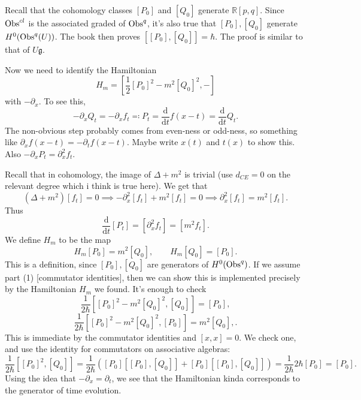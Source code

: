 Recall that the cohomology classes $[P_0]$ and $[Q_0]$ generate $\mathbb{R} [p,q]$. Since $\operatorname{Obs}^{cl} $ is the associated graded of $\operatorname{Obs}^{q} $, it's also true that $[P_0],[Q_0]$ generate $H^0(\operatorname{Obs}^q(U))$. The book then proves $[[P_0],[Q_0]]=\hbar $. The proof is similar to that of $U\mathfrak{g} $.

Now we need to identify the Hamiltonian
\[
	H_m = \left[ \frac{1}{2} [P_0]^2 - m^2[Q_0]^2,- \right] 
\]
with $-\partial _x$. To see this,
\[
	-\partial _xQ_t = -\partial _x f_t \eqqcolon P_t = \frac{\mathrm{d}}{\mathrm{d}t} f(x-t)=\frac{\mathrm{d}}{\mathrm{d}t} Q_t
.\]
The non-obvious step probably comes from even-ness or odd-ness, so something like $\partial _xf(x-t) = -\partial _t f(x-t)$. Maybe write $x(t)$ and $t(x)$ to show this. Also $-\partial _xP_t = \partial _x^2 f_t$.

Recall that in cohomology, the image of $\Delta+m^2$ is trivial (use $d_{CE} =0$ on the relevant degree which i think is true here). We get that
\[
	(\Delta +m^2)[f_t] = 0 \implies -\partial _x^2[f_t] + m^2[f_t] = 0 \implies \partial _x^2[f_t] = m^2[f_t]
.\]
Thus
\[
	\frac{\mathrm{d}}{\mathrm{d}t} [P_t] = [\partial _x^2f_t] = [m^2f_t]
.\]
We define $H_m$ to be the map
\[
	H_m[P_0] = m^2[Q_0],\qquad H_m[Q_0] = [P_0]
.\]
This is a definition, since $[P_0],[Q_0]$ are generators of $H^0(\operatorname{Obs}^q)$. If we assume part (1) [commutator identities], then we can show this is implemented precisely by the Hamiltonian $H_m$ we found. It's enough to check
\[
	\frac{1}{2\hbar } \left[ [P_0]^2-m^2[Q_0]^2,[Q_0] \right] =[P_0],
\]
\[
	\frac{1}{2\hbar } \left[ [P_0]^2-m^2[Q_0]^2,[P_0] \right] =m^2[Q_0],
.\]
This is immediate by the commutator identities and $[x,x]=0$. We check one, and use the identity for commutators on associative algebras:
\[
	\frac{1}{2\hbar } \left[ [P_0]^2,[Q_0] \right] =\frac{1}{2\hbar } \left([P_0][[P_0],[Q_0]] + [P_0][[P_0],[Q_0]]\right)=\frac{1}{2\hbar } 2\hbar[P_0]=[P_0]
.\]
Using the idea that $-\partial _x = \partial _t$, we see that the Hamiltonian kinda corresponds to the generator of time evolution.
